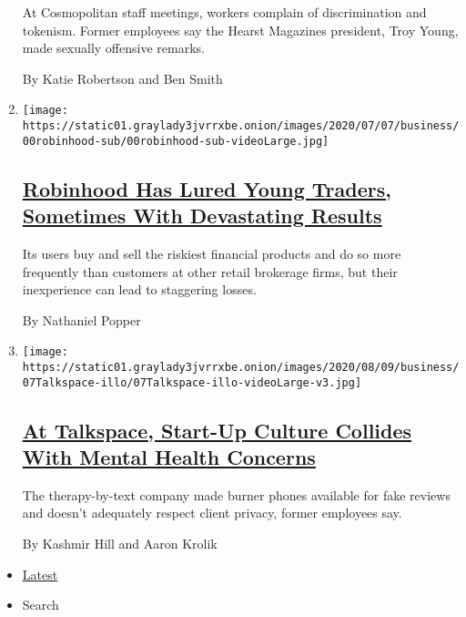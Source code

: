 \begin{enumerate}
  At Cosmopolitan staff meetings, workers complain of discrimination and
  tokenism. Former employees say the Hearst Magazines president, Troy
  Young, made sexually offensive remarks.

  By Katie Robertson and Ben Smith
\item
  \texttt{[image: https://static01.graylady3jvrrxbe.onion/images/2020/07/07/business/00robinhood-sub/00robinhood-sub-videoLarge.jpg]}

  \hypertarget{robinhood-has-lured-young-traders-sometimes-with-devastating-results}{%
  \subsection{\texorpdfstring{\href{/2020/07/08/technology/robinhood-risky-trading.html}{Robinhood
  Has Lured Young Traders, Sometimes With Devastating
  Results}}{Robinhood Has Lured Young Traders, Sometimes With Devastating Results}}\label{robinhood-has-lured-young-traders-sometimes-with-devastating-results}}

  Its users buy and sell the riskiest financial products and do so more
  frequently than customers at other retail brokerage firms, but their
  inexperience can lead to staggering losses.

  By Nathaniel Popper
\item
  \texttt{[image: https://static01.graylady3jvrrxbe.onion/images/2020/08/09/business/07Talkspace-illo/07Talkspace-illo-videoLarge-v3.jpg]}

  \hypertarget{at-talkspace-start-up-culture-collides-with-mental-health-concerns}{%
  \subsection{\texorpdfstring{\href{/2020/08/07/technology/talkspace.html}{At
  Talkspace, Start-Up Culture Collides With Mental Health
  Concerns}}{At Talkspace, Start-Up Culture Collides With Mental Health Concerns}}\label{at-talkspace-start-up-culture-collides-with-mental-health-concerns}}

  The therapy-by-text company made burner phones available for fake
  reviews and doesn't adequately respect client privacy, former
  employees say.

  By Kashmir Hill and Aaron Krolik
\end{enumerate}

\begin{itemize}
\tightlist
\item
  \protect\hyperlink{stream-panel}{Latest}
\item
  Search
\end{itemize}

